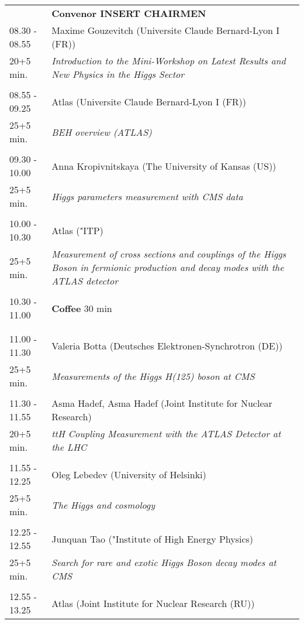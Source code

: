 \begin{longtable}{p{3cm}p{13cm}}
&\hfill {\bf Convenor INSERT CHAIRMEN }\\ 
08.30 - 08.55 & Maxime Gouzevitch (Universite Claude Bernard-Lyon I (FR))\\ 
20+5 min. & {\it Introduction to the Mini-Workshop on Latest Results and New Physics in the Higgs Sector}\\ 
 & \\ 
08.55 - 09.25 & Atlas (Universite Claude Bernard-Lyon I (FR))\\ 
25+5 min. & {\it BEH overview (ATLAS)}\\ 
 & \\ 
09.30 - 10.00 & Anna Kropivnitskaya (The University of Kansas (US))\\ 
25+5 min. & {\it Higgs parameters measurement with CMS data}\\ 
 & \\ 
10.00 - 10.30 & Atlas ("ITP)\\ 
25+5 min. & {\it Measurement of cross sections and couplings of the Higgs Boson in fermionic production and decay modes with the ATLAS detector}\\ 
 & \\ 
10.30 - 11.00 & {\bf Coffee} \hfill 30 min \\ 
 & \\ 
 & \\ 
11.00 - 11.30 & Valeria Botta (Deutsches Elektronen-Synchrotron (DE))\\ 
25+5 min. & {\it Measurements of the Higgs H(125) boson at CMS}\\ 
 & \\ 
11.30 - 11.55 & Asma Hadef, Asma Hadef (Joint Institute for Nuclear Research)\\ 
20+5 min. & {\it ttH Coupling Measurement with the ATLAS Detector at the LHC}\\ 
 & \\ 
11.55 - 12.25 & Oleg Lebedev (University of Helsinki)\\ 
25+5 min. & {\it The Higgs and cosmology}\\ 
 & \\ 
12.25 - 12.55 & Junquan Tao ("Institute of High Energy Physics)\\ 
25+5 min. & {\it Search for rare and exotic Higgs Boson decay modes at CMS}\\ 
 & \\ 
12.55 - 13.25 & Atlas (Joint Institute for  Nuclear Research (RU))\\ 

\end{longtable}
